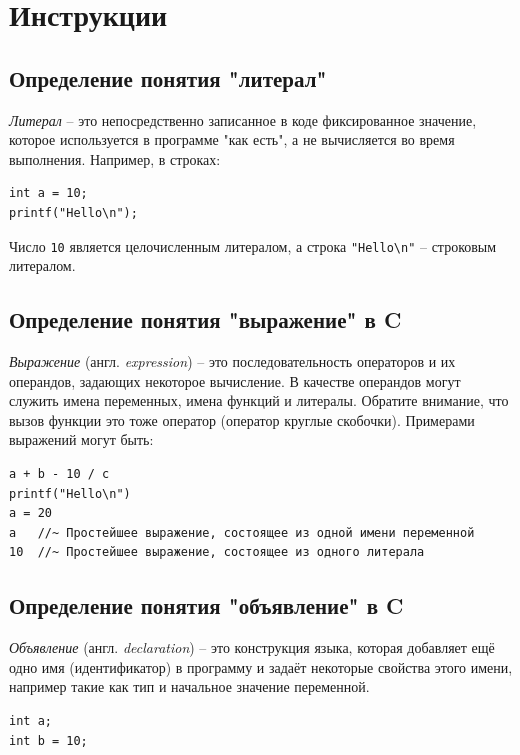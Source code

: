 \documentclass{article}
\begin{document}
\newpage

\section*{Инструкции}
\subsection*{Определение понятия "литерал"{}}
\textit{Литерал} -- это непосредственно записанное в коде фиксированное значение, которое используется в программе "как есть"{}, а не вычисляется во время выполнения. Например, в строках:
\begin{lstlisting}
int a = 10;
printf("Hello\n");
\end{lstlisting}
Число \texttt{10} является целочисленным литералом, а строка \texttt{"Hello\textbackslash n"} -- строковым литералом.

\subsection*{Определение понятия "выражение"{} в C}
\textit{Выражение} (англ. \textit{expression}) -- это последовательность операторов и их операндов, задающих некоторое вычисление. В качестве операндов могут служить имена переменных, имена функций и литералы. Обратите внимание, что вызов функции это тоже оператор (оператор круглые скобочки). Примерами выражений могут быть:
\begin{lstlisting}
a + b - 10 / c
printf("Hello\n")
a = 20
a  	//~ Простейшее выражение, состоящее из одной имени переменной
10  //~ Простейшее выражение, состоящее из одного литерала
\end{lstlisting}


\subsection*{Определение понятия "объявление"{} в C}
\textit{Объявление} (англ. \textit{declaration}) -- это конструкция языка, которая добавляет ещё одно имя (идентификатор) в программу и задаёт некоторые свойства этого имени, например такие как тип и начальное значение переменной.
\begin{lstlisting}
int a;
int b = 10;
\end{lstlisting}
\end{document}
